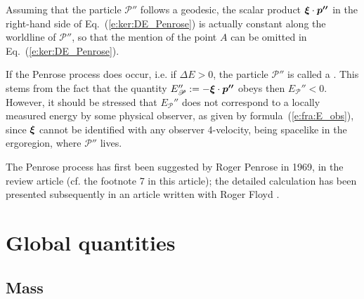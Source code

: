 \begin{remark}
Assuming that the particle $\mathscr{P}''$ follows a geodesic,
the scalar product $\bm{\xi} \cdot \bm{p''}$ in the right-hand side of Eq.~(\ref{e:ker:DE_Penrose}) is actually constant along the worldline of
$\mathscr{P}''$, so that the mention of the point $A$ can be omitted in
Eq.~(\ref{e:ker:DE_Penrose}).
\end{remark}

\begin{remark} \label{r:ker:negative_energy}
If the Penrose process does occur, i.e. if
$\Delta E > 0$, the particle $\mathscr{P}''$ is called a
. This
stems from the fact that the quantity
$E_\mathscr{P}'' := - \bm{\xi}\cdot\bm{p''}$ obeys
then $E_\mathscr{P}'' < 0$. However, it should be stressed that
$E_\mathscr{P}''$ does not correspond to a locally measured energy by some
physical observer, as given by formula~(\ref{e:fra:E_obs}), since $\bm{\xi}$ cannot be identified with any observer
4-velocity, being spacelike in the ergoregion, where $\mathscr{P}''$ lives.
\end{remark}

\begin{hist}
The Penrose process has first been suggested by Roger Penrose
in 1969,
in the review article \cite{Penro69} (cf. the footnote 7 in this article);
the detailed calculation has been presented subsequently in an
article written with Roger Floyd \cite{PenroF71}.
\end{hist}



\section{Global quantities} \label{s:ker:global_quantities}

\subsection{Mass} \label{s:ker:Komar_mass}

